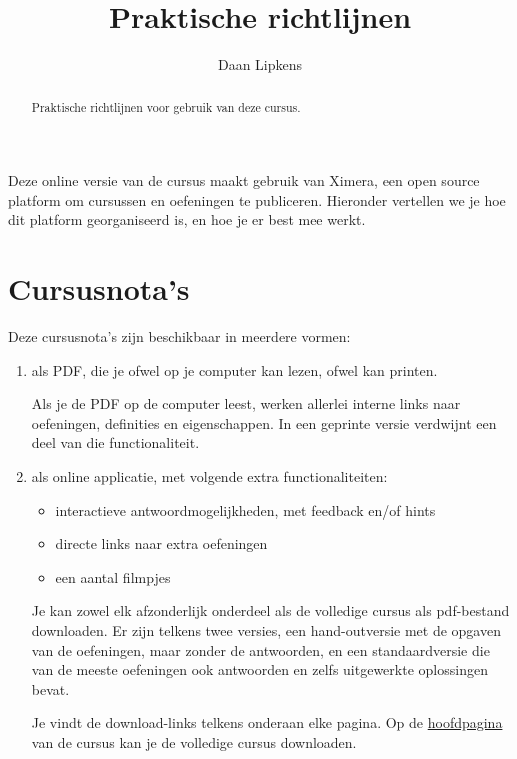 \documentclass{ximera}
\title{Praktische richtlijnen}
\author{Daan Lipkens}
\begin{document}
\begin{abstract}
    Praktische richtlijnen voor gebruik van deze cursus.
\end{abstract}
\maketitle

Deze online versie van de cursus maakt gebruik van Ximera, een open source platform om cursussen en oefeningen te publiceren. Hieronder vertellen we je hoe dit platform georganiseerd is, en hoe je er best mee werkt.

\section*{Cursusnota's}
Deze cursusnota's zijn beschikbaar in meerdere vormen:
\begin{enumerate}
    \item als PDF, die je ofwel op je computer kan lezen, ofwel kan printen.
             
            Als je de PDF op de computer leest, werken allerlei interne links naar oefeningen, definities en eigenschappen. In een geprinte versie verdwijnt een deel van die functionaliteit.
     
             
 
   \item als online applicatie, met volgende extra functionaliteiten:
        \begin{itemize}
            \item interactieve antwoordmogelijkheden, met feedback en/of hints
            \item directe links naar extra oefeningen 
            \item een aantal filmpjes
        \end{itemize}
        Je kan zowel elk afzonderlijk onderdeel als de volledige cursus als pdf-bestand downloaden. Er zijn telkens twee versies, een hand-outversie met de opgaven van de oefeningen, maar zonder de antwoorden, en een standaardversie die van de meeste oefeningen ook antwoorden en zelfs uitgewerkte oplossingen bevat.
        \begin{onlineOnly}
        Je vindt de download-links telkens onderaan elke pagina. Op de \href{https://xerxes.ximera.org/sui/5de/Cursus_DDO}{hoofdpagina} van de cursus kan je de volledige cursus downloaden.
         
        \end{onlineOnly}
 
\end{enumerate}
\end{document}
